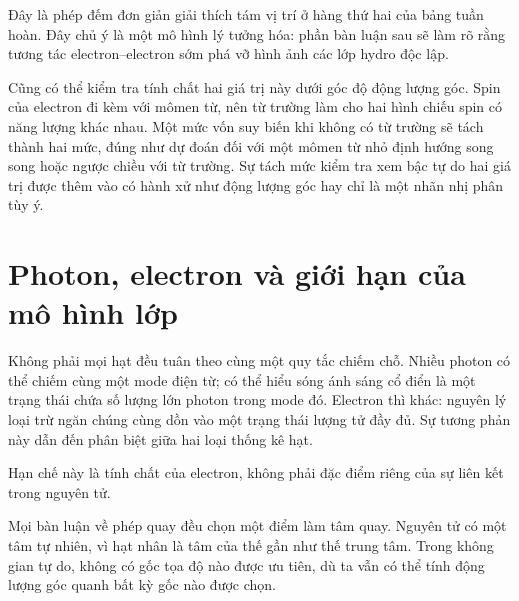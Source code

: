 Đây là phép đếm đơn giản giải thích tám vị trí ở hàng thứ hai của bảng tuần hoàn. Đây chủ ý là một mô hình lý tưởng hóa: phần bàn luận sau sẽ làm rõ rằng tương tác electron--electron sớm phá vỡ hình ảnh các lớp hydro độc lập.

Cũng có thể kiểm tra tính chất hai giá trị này dưới góc độ động lượng góc. Spin của electron đi kèm với mômen từ, nên từ trường làm cho hai hình chiếu spin có năng lượng khác nhau. Một mức vốn suy biến khi không có từ trường sẽ tách thành hai mức, đúng như dự đoán đối với một mômen từ nhỏ định hướng song song hoặc ngược chiều với từ trường. Sự tách mức kiểm tra xem bậc tự do hai giá trị được thêm vào có hành xử như động lượng góc hay chỉ là một nhãn nhị phân tùy ý.

\section{Photon, electron và giới hạn của mô hình lớp}

Không phải mọi hạt đều tuân theo cùng một quy tắc chiếm chỗ. Nhiều photon có thể chiếm cùng một mode điện từ; có thể hiểu sóng ánh sáng cổ điển là một trạng thái chứa số lượng lớn photon trong mode đó. Electron thì khác: nguyên lý loại trừ ngăn chúng cùng dồn vào một trạng thái lượng tử đầy đủ. Sự tương phản này dẫn đến phân biệt giữa hai loại thống kê hạt.

\begin{classroomqa}
\end{classroomqa}

Hạn chế này là tính chất của electron, không phải đặc điểm riêng của sự liên kết trong nguyên tử.

\begin{classroomqa}
\end{classroomqa}

Mọi bàn luận về phép quay đều chọn một điểm làm tâm quay. Nguyên tử có một tâm tự nhiên, vì hạt nhân là tâm của thế gần như thế trung tâm. Trong không gian tự do, không có gốc tọa độ nào được ưu tiên, dù ta vẫn có thể tính động lượng góc quanh bất kỳ gốc nào được chọn.

